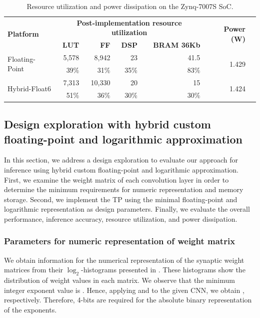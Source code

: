 \begin{table}[!htp]\centering
	\caption{Resource utilization and power dissipation on the Zynq-7007S SoC.}\label{tab: }
	\scriptsize
	\begin{tabular}{lrrrrrr}\toprule
		\multirow{2}{*}{\textbf{Platform}} &\multicolumn{4}{c}{\textbf{Post-implementation resource utilization}} &\multirow{2}{*}{\textbf{Power (W)}} \\\cmidrule{2-5}
		&\textbf{LUT} &\textbf{FF} &\textbf{DSP} &\textbf{BRAM 36Kb} & \\\midrule
		\multirow{2}{*}{Floating-Point} &5,578 &8,942 &23 &41.5 &\multirow{2}{*}{1.429} \\
		&39\% &31\% &35\% &83\% & \\
		\multirow{2}{*}{Hybrid-Float6} &7,313 &10,330 &20 &15 &\multirow{2}{*}{1.424} \\
		&51\% &36\% &30\% &30\% & \\
		\bottomrule
	\end{tabular}
\end{table}



\subsection{Design exploration with hybrid custom floating-point and logarithmic approximation}

In this section, we address a design exploration to evaluate our approach for inference using hybrid custom floating-point and logarithmic approximation. First, we examine the weight matrix of each convolution layer in order to determine the minimum requirements for numeric representation and memory storage. Second, we implement the TP using the minimal floating-point and logarithmic representation as design parameters. Finally, we evaluate the overall performance, inference accuracy, resource utilization, and power dissipation.

\subsubsection{Parameters for numeric representation of weight matrix}
\label{sec:parameters}
We obtain information for the numerical representation of the synaptic weight matrices from their $\log_2$-histograms presented in {}. These histograms show the distribution of weight values in each matrix. We observe that the minimum integer exponent value is . Hence, applying  and  to the given CNN, we obtain , respectively. Therefore, 4-bits are required for the absolute binary representation of the exponents.

